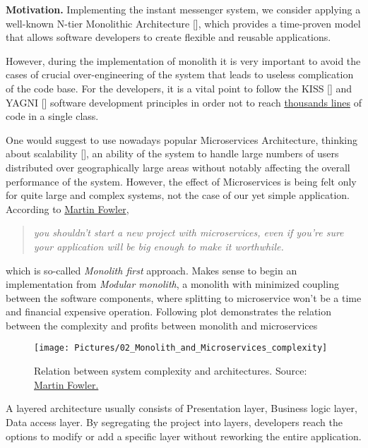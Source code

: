 \textbf{Motivation.} Implementing the instant messenger system, we consider applying a well-known N-tier
Monolithic Architecture [\cite{bucchiarone2018monolithic}], which provides a time-proven model that allows software
developers to create flexible and reusable applications.

However, during the implementation of monolith it is very important to avoid the cases of crucial over-engineering
of the system that leads to useless complication of the code base.
For the developers, it is a vital point to follow the KISS [\cite{alwin2016kiss}] and YAGNI [\cite{da2018evolution}]
software development principles in order not to reach
\href{https://github.com/smartstore/SmartStoreNET/blob/4.x/src/Presentation/SmartStore.Web/Controllers/CatalogHelper.cs}
{thousands lines}
of code in a single class.

One would suggest to use nowadays popular Microservices Architecture, thinking about scalability [\cite{brataas2004exploring}],
an ability of the system to handle large numbers of users distributed over geographically large areas without
notably affecting the overall performance of the system.
However, the effect of Microservices is being felt only for quite large and complex systems,
not the case of our yet simple application.
According to \href{https://martinfowler.com/bliki/MonolithFirst.html}{Martin Fowler},
\begin{quote}
    \textit{you shouldn't start a new project with microservices, even if you're sure your application will be big enough to
    make it worthwhile.}
\end{quote}
which is so-called \textit{Monolith first} approach.
Makes sense to begin an implementation from \textit{Modular monolith}, a monolith with minimized coupling between the
software components, where splitting to microservice won't be a time and financial expensive operation.
Following plot demonstrates the relation between the complexity and profits between monolith and microservices

\begin{figure}[H]
    \centering
    \texttt{[image: Pictures/02\_Monolith\_and\_Microservices\_complexity]}
    \caption{Relation between system complexity and architectures.
    Source: \href{https://martinfowler.com/bliki/MicroservicePremium.html}{Martin Fowler.}}
    \label{fig:monolith_vs_microservice}
\end{figure}

A layered architecture usually consists of Presentation layer, Business logic layer, Data access layer.
By segregating the project into layers, developers reach the options to modify or add a specific layer
without reworking the entire application.

